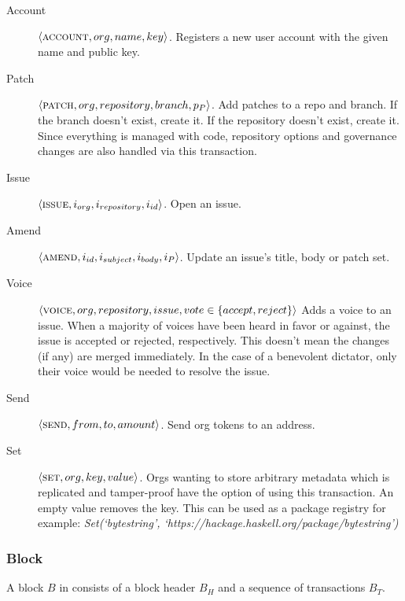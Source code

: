 \begin{description}
    \item[Account] $\langle \text{\normalfont\scshape account}, org, name, key \rangle$. Registers a new user account
        with the given name and public key.
    \item[Patch] $\langle \text{\normalfont\scshape patch}, org, repository, branch, p_P \rangle$.  Add patches to a
        repo and branch. If the branch doesn’t exist, create it. If the
        repository doesn’t exist, create it. Since everything is managed with
        code, repository options and governance changes are also handled via
        this transaction.
    \item[Issue] $\langle \text{\normalfont\scshape issue}, i_{org}, i_{repository}, i_{id} \rangle$. Open an issue.
    \item[Amend] $\langle \text{\normalfont\scshape amend}, i_{id}, i_{subject}, i_{body}, i_P \rangle$.
        Update an issue's title, body or patch set.
    \item[Voice] $\langle \text{\normalfont\scshape voice}, org, repository, issue, vote \in \{accept, reject\} \rangle$
        Adds a voice to an issue. When a majority of voices have been heard in
        favor or against, the issue is accepted or rejected, respectively. This
        doesn’t mean the changes (if any) are merged immediately. In the case
        of a benevolent dictator, only their voice would be needed to resolve
        the issue.
    \item[Send] $\langle \text{\normalfont\scshape send}, from, to, amount \rangle$. Send org tokens to an address.
    \item[Set] $\langle \text{\normalfont\scshape set}, org, key, value \rangle$. Orgs wanting to store
        arbitrary metadata which is replicated and tamper-proof have the option
        of using this transaction. An empty value removes the key. This can be
        used as a package registry for example: \emph{Set(`bytestring',
        `https://hackage.haskell.org/package/bytestring')}
\end{description}

\subsubsection{Block}

A block $B$ in \oscoin{} consists of a block header $B_H$ and a sequence of
transactions $B_T$.

